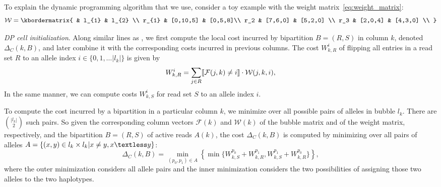To explain the dynamic programming algorithm that we use, consider a toy example with the weight matrix~\eqref{eq:weight_matrix}:
\begin{equation}\label{eq:weight_matrix1}
  \mathcal{W}  = \kbordermatrix{
     & l_{1}       & l_{2}  \\
    r_{1}       & [0,10,5] &  [0,5,8]\\
    r_2 & [7,6,0] & [5,2,0] \\
    r_3 & [2,0,4] & [4,3,0] \\
  }
\end{equation}

\textit{DP cell initialization}. Along similar lines as \cite{Patterson2015}, we first compute the local cost incurred by bipartition $B= (R,S)$ in column $k$, denoted $\Delta_C(k,B)$, and later combine it with the corresponding costs incurred in previous columns.
The cost $W_{k,R}^i$ of flipping all entries in a read set $R$ to an allele index $i\in\{0,1,\ldots |l_k|\}$ is given by 
\[W_{k,R}^i = \sum_{j\in R}\llbracket \mathcal{F}(j,k)\neq i\rrbracket\cdot\mathcal{W}(j,k,i),\]
In the same manner, we can compute costs $W_{k,S}^i$ for read set $S$ to an allele index $i$.

To compute the cost incurred by a bipartition in a particular column $k$, we minimize over all possible pairs of alleles in bubble $l_k$.
There are ${|l_k| \choose 2}$ such pairs.
So given the corresponding column vectors $\mathcal{F}(k)$ and $\mathcal{W}(k)$ of the bubble matrix and of the weight matrix, respectively, and the bipartition $B=(R,S)$ of active reads $A(k)$, the cost $\Delta_C(k,B)$ is computed by minimizing over all pairs of alleles
$A = \{(x,y) \in l_k \times l_k | x \ne y, x\textless y\}$:
\begin{equation}\label{eq:dp-cell}
  \Delta_C(k,B)= \min_{(p_0,p_1)\in {A}}\left\{\min\{W_{k,S}^{p_0} + W_{k,R}^{p_1}, W_{k,S}^{p_1} + W_{k,R}^{p_0}\}\right\},
\end{equation}
where the outer minimization considers all allele pairs and the inner minimization considers the two possibilities of assigning those two alleles to the two haplotypes.

   

%     


